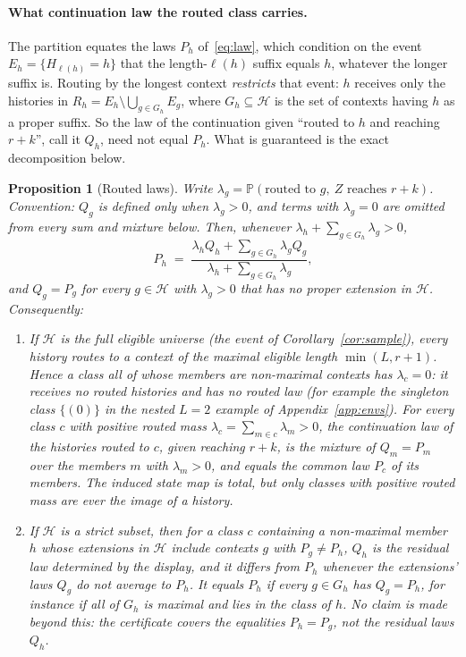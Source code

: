 \documentclass{article}
\newtheorem{proposition}[theorem]{Proposition}
\newcommand{\cH}{\mathcal H}
\newcommand{\Prb}{\mathbb P}
\begin{document}
\paragraph{What continuation law the routed class carries.}
The partition equates the laws $P_h$ of~\eqref{eq:law}, which condition on the
event $E_h=\{H_{\ell(h)}=h\}$ that the length-$\ell(h)$ suffix equals $h$,
whatever the longer suffix is.  Routing by the longest context
\emph{restricts} that event: $h$ receives only the histories in
$R_h=E_h\setminus\bigcup_{g\in G_h}E_g$, where $G_h\subseteq\cH$ is the set
of contexts having $h$ as a proper suffix.  So the law of the continuation
given ``routed to $h$ and reaching $r+k$'', call it $Q_h$, need not equal
$P_h$.  What is guaranteed is the exact decomposition below.

\begin{proposition}[Routed laws]\label{prop:routing}
Write $\lambda_g=\Prb(\text{routed to }g,\ Z\text{ reaches }r+k)$.
Convention: $Q_g$ is defined only when $\lambda_g>0$, and terms with
$\lambda_g=0$ are omitted from every sum and mixture below.  Then, whenever
$\lambda_h+\sum_{g\in G_h}\lambda_g>0$,
\[
  P_h\;=\;\frac{\lambda_h Q_h+\sum_{g\in G_h}\lambda_g Q_g}
                {\lambda_h+\sum_{g\in G_h}\lambda_g},
\]
and $Q_g=P_g$ for every $g\in\cH$ with $\lambda_g>0$ that has no proper
extension in $\cH$.
Consequently:
\begin{enumerate}
\item If $\cH$ is the full eligible universe (the event of
Corollary~\ref{cor:sample}), every history routes to a context of the
maximal eligible length $\min(L,r+1)$.  Hence a class all of whose members
are non-maximal contexts has $\lambda_c=0$: it receives no routed histories
and has no routed law (for example the singleton class $\{(0)\}$ in the nested
$L=2$ example of Appendix~\ref{app:envs}).  For every class $c$ with positive
routed mass $\lambda_c=\sum_{m\in c}\lambda_m>0$, the continuation law of the
histories routed to $c$, given reaching $r+k$, is the mixture of $Q_m=P_m$
over the members $m$ with $\lambda_m>0$, and equals the common law $P_c$ of
its members.  The induced state map is total, but only classes with positive
routed mass are ever the image of a history.
\item If $\cH$ is a strict subset, then for a class $c$ containing a
non-maximal member $h$ whose extensions in $\cH$ include contexts $g$ with
$P_g\ne P_h$, $Q_h$ is the residual law determined by the display, and it
differs from $P_h$ whenever the extensions' laws $Q_g$ do not average to
$P_h$.  It equals $P_h$ if every $g\in G_h$ has $Q_g=P_h$, for instance if all of $G_h$
is maximal and lies in the class of $h$.  No claim is
made beyond this: the certificate covers the equalities $P_h=P_g$, not the
residual laws $Q_h$.
\end{enumerate}
\end{proposition}
\end{document}
